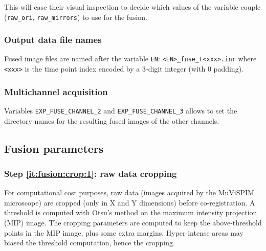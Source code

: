 \mbox{}
\mbox{}

This will ease their visual inspection to decide which values of the variable couple
(\texttt{raw\_ori}, \texttt{raw\_mirrors}) to use for the fusion.

\subsubsection{Output data file names}

Fused image files are named after the variable \texttt{EN}:
\texttt{<EN>\_fuse\_t<xxx>.inr} where \texttt{<xxx>} is the time point
index encoded by a 3-digit integer (with 0 padding).


\subsubsection{Multichannel acquisition}

Variables \texttt{EXP\_FUSE\_CHANNEL\_2} and
\texttt{EXP\_FUSE\_CHANNEL\_3} allows to set the directory names for
the resulting fused images of the other channels.

\subsection{Fusion parameters}


\subsubsection{Step \ref{it:fusion:crop:1}: raw data cropping}
\label{sec:cli:fuse:raw:data:cropping}

For computational cost purposes, raw data (images acquired by the MuViSPIM microscope) are cropped (only in X and Y dimensions) before co-registration. A threshold is computed with Otsu's method \cite{otsu:tsmc:1979} on the maximum intensity projection (MIP) image. The cropping parameters are computed to keep the above-threshold points in the MIP image, plus some extra margins. Hyper-intense areas may biased the threshold computation, hence the cropping.

